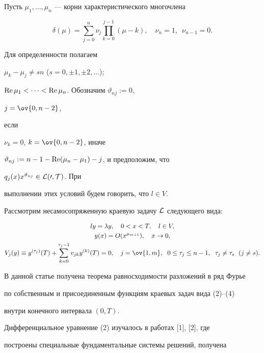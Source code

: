 Пусть $\mu_1,\dotsc,\mu_n$ --- корни характеристического многочлена


$$


\delta(\mu)=\sum^n_{j=0}\nu_j\prod^{j-1}_{k=0}(\mu-k),\quad


\nu_n=1,\ \; \nu_{n-1}=0.


$$


Для определенности полагаем


$\mu_k-\mu_j\ne sn$ ($s=0,\pm 1,\pm 2,\dotsc$);


$\operatorname{Re}\mu_1<\dotsb<\operatorname{Re}\mu_n$. Обозначим $\vartheta_{nj}:=0$,


$j=\ov{0,n-2}$,


если


$\nu_k=0$, $k=\ov{0,n-2}$, иначе


$\vartheta_{nj}:=n-1-\operatorname{Re}(\mu_n-\mu_1)-j$, и предположим, что


$q_j(x)x^{\vartheta_{nj}}\in\cal L(0,T)$. При


выполнении этих условий будем говорить, что $l\in V$.





Рассмотрим несамосопряженную краевую задачу $\cal L$ следующего вида:


\begin{gather}


ly=\lambda y,\quad 0<x<T,\quad l\in V,\\


y(x)=O(x^{\mu_{m+1}}),\quad x\to 0,\\


V_j(y)\equiv y^{(\tau_j)}(T)+\sum^{\tau_j-1}_{k=0}v_{jk}


y^{(k)}(T)=0,\quad j=\ov{1,m},\ \;0\le\tau_j\le n-1, \ \;


\tau_j\ne \tau_s \ \;(j\ne s).


\end{gather}





В данной статье получена теорема равносходимости разложений в ряд Фурье


по собственным и присоединенным функциям краевых задач вида (2)--(4)


внутри конечного интервала $(0,T)$.





Дифференциальное уравнение (2) изучалось в работах [1], [2], где


построены специальные фундаментальные системы решений, получена



